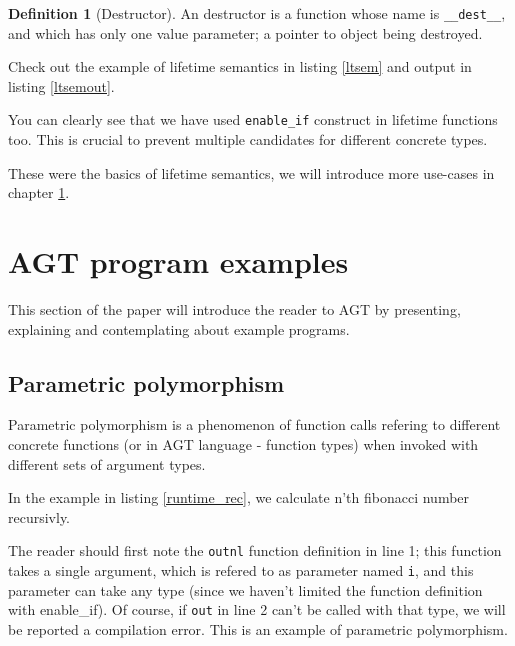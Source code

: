 \documentclass[times, utf8, diplomski]{fer}
\theoremstyle{definition}
\newtheorem{definition}{Definition}[]
\newcommand{\textcode}[3]{
    
}
\begin{document}
\begin{definition}[Destructor]
An destructor is a function whose name is \texttt{\_\_dest\_\_}, and which has only one value parameter;
a pointer to object being destroyed.
\end{definition}

Check out the example of lifetime semantics in listing \ref{ltsem} and output in listing \ref{ltsemout}.

\textcode{\resdir/compiler/lifetime_ex.agt}{ltsem}{Lifetime semantics}
\textcode{\resdir/compiler/lifetime_ex.out}{ltsemout}{Lifetime semantics - output}

You can clearly see that we have used \texttt{enable\_if} construct in lifetime functions too.
This is crucial to prevent multiple candidates for different concrete types.

These were the basics of lifetime semantics, we will introduce more use-cases
in chapter \ref{chap:examples}.




\chapter{AGT program examples}\label{chap:examples}

This section of the paper will introduce the reader to AGT by presenting, explaining and contemplating
about example programs.

\section{Parametric polymorphism}

Parametric polymorphism is a phenomenon of function calls refering to different concrete functions 
(or in AGT language - function types) when invoked with different sets of argument types.

In the example in listing \ref{runtime_rec}, we calculate n'th fibonacci number recursivly.

\textcode{\resdir/programs/fib_runtime_recursion.agt}{runtime_rec}
{Fibonacci with recursion, Parametric Polymorphism}

The reader should first note the \texttt{outnl} function definition in line 1;
this function takes a single argument, which is refered to as parameter named \texttt{i},
and this parameter can take any type (since we haven't limited the function definition with enable\_if).
Of course, if \texttt{out} in line 2 can't be called with that type, we will be
reported a compilation error. This is an example of parametric polymorphism.
\end{document}
